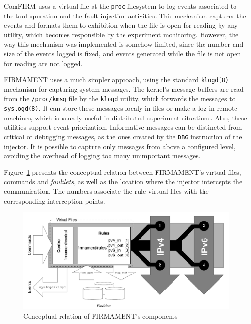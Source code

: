 \documentclass[11pt]{article}
\begin{document}
\textsf{ComFIRM} uses a virtual file at the \texttt{proc} filesystem to log events associated to the tool operation and the fault injection activities. This mechanism captures the events and formats them to exhibition when the file is open for reading by any utility, which becomes responsible by the experiment monitoring. However, the way this mechanism was implemented is somehow limited, since the number and size of the events logged is fixed, and events generated while the file is not open for reading are not logged.

\textsf{FIRMAMENT} uses a much simpler approach, using the standard \texttt{klogd(8)} mechanism for capturing system messages. The kernel's message buffers are read from the \texttt{/proc/kmsg} file by the \texttt{klogd} utility, which forwards the messages to \texttt{syslogd(8)}. It can store these messages localy in files or make a log in remote machines, which is usually useful in distributed experiment situations. Also, these utilities support event priorization. Informative messages can be distincted from critical or debugging messages, as the ones created by the \texttt{DBG} instruction of the injector. It is possible to capture only messages from above a configured level, avoiding the overhead of logging too many unimportant messages.

Figure~\ref{fig:arqfirm} presents the conceptual relation between \textsf{FIRMAMENT}'s virtual files, commands and {\em faultlets}, as well as the location where the injector intercepts the communication. The numbers associate the rule virtual files with the corresponding interception points. 

\begin{figure}[tb]
\centering
\includegraphics[width=.95\textwidth]{fig/architecture}
\caption{Conceptual relation of \textsf{FIRMAMENT}'s components}
\label{fig:arqfirm}
\end{figure}
\end{document}
